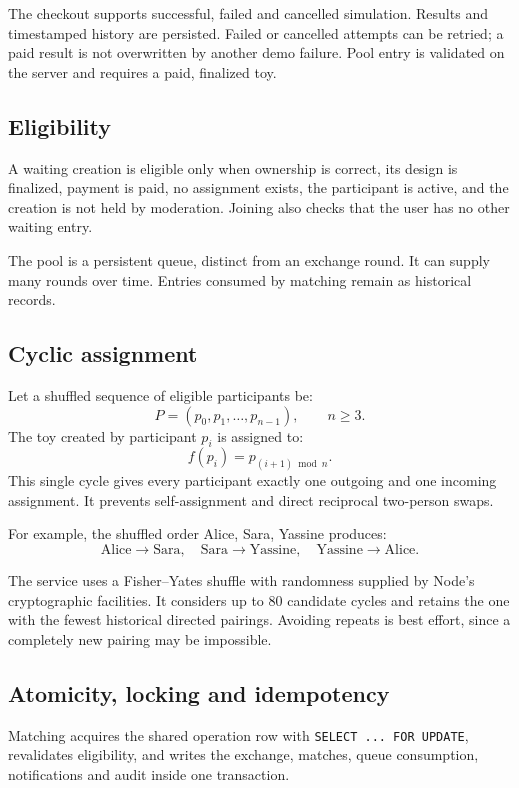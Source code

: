 \documentclass[11pt,a4paper]{article}
\begin{document}
The checkout supports successful, failed and cancelled simulation. Results and timestamped history are persisted. Failed or cancelled attempts can be retried; a paid result is not overwritten by another demo failure. Pool entry is validated on the server and requires a paid, finalized toy.

\subsection{Eligibility}
A waiting creation is eligible only when ownership is correct, its design is finalized, payment is paid, no assignment exists, the participant is active, and the creation is not held by moderation. Joining also checks that the user has no other waiting entry.

The pool is a persistent queue, distinct from an exchange round. It can supply many rounds over time. Entries consumed by matching remain as historical records.

\subsection{Cyclic assignment}
Let a shuffled sequence of eligible participants be:
\[
P=(p_0,p_1,\ldots,p_{n-1}), \qquad n\geq 3.
\]
The toy created by participant $p_i$ is assigned to:
\[
f(p_i)=p_{(i+1)\bmod n}.
\]
This single cycle gives every participant exactly one outgoing and one incoming assignment. It prevents self-assignment and direct reciprocal two-person swaps.

For example, the shuffled order Alice, Sara, Yassine produces:
\[
\text{Alice}\rightarrow\text{Sara},\quad
\text{Sara}\rightarrow\text{Yassine},\quad
\text{Yassine}\rightarrow\text{Alice}.
\]

The service uses a Fisher--Yates shuffle with randomness supplied by Node's cryptographic facilities. It considers up to 80 candidate cycles and retains the one with the fewest historical directed pairings. Avoiding repeats is best effort, since a completely new pairing may be impossible.

\subsection{Atomicity, locking and idempotency}
Matching acquires the shared operation row with \texttt{SELECT ... FOR UPDATE}, revalidates eligibility, and writes the exchange, matches, queue consumption, notifications and audit inside one transaction.
\end{document}
